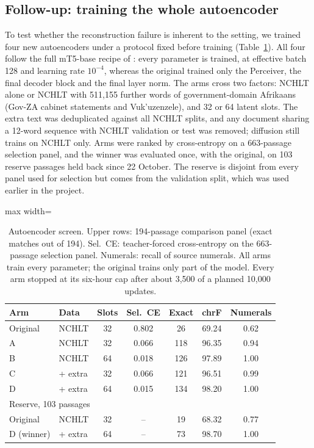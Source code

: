 \documentclass[11pt,a4paper]{article}
\begin{document}
\subsection{Follow-up: training the whole autoencoder}
\label{sec:res-aescreen}

To test whether the reconstruction failure is inherent to the setting, we trained four new autoencoders under a protocol fixed before training (Table~\ref{tab:aescreen}). All four follow the full mT5-base recipe of \citet{lovelace2023latent}: every parameter is trained, at effective batch 128 and learning rate $10^{-4}$, whereas the original trained only the Perceiver, the final decoder block and the final layer norm. The arms cross two factors: NCHLT alone or NCHLT with 511,155 further words of government-domain Afrikaans (Gov-ZA cabinet statements and Vuk'uzenzele), and 32 or 64 latent slots. The extra text was deduplicated against all NCHLT splits, and any document sharing a 12-word sequence with NCHLT validation or test was removed; diffusion still trains on NCHLT only. Arms were ranked by cross-entropy on a 663-passage selection panel, and the winner was evaluated once, with the original, on 103 reserve passages held back since 22 October. The reserve is disjoint from every panel used for selection but comes from the validation split, which was used earlier in the project.

\begin{table}[t]
\centering
\small
\begin{adjustbox}{max width=\columnwidth}
\begin{tabular}{llccccc}
\toprule
Arm & Data & Slots & Sel.\ CE & Exact & chrF & Numerals \\
\midrule
Original & NCHLT & 32 & 0.802 & 26 & 69.24 & 0.62 \\
A & NCHLT & 32 & 0.066 & 118 & 96.35 & 0.94 \\
B & NCHLT & 64 & 0.018 & 126 & 97.89 & 1.00 \\
C & + extra & 32 & 0.066 & 121 & 96.51 & 0.99 \\
D & + extra & 64 & 0.015 & 134 & 98.20 & 1.00 \\
\midrule
\multicolumn{7}{l}{Reserve, 103 passages} \\
Original & NCHLT & 32 & -- & 19 & 68.32 & 0.77 \\
D (winner) & + extra & 64 & -- & 73 & 98.70 & 1.00 \\
\bottomrule
\end{tabular}
\end{adjustbox}
\caption{Autoencoder screen. Upper rows: 194-passage comparison panel (exact matches out of 194). Sel.\ CE: teacher-forced cross-entropy on the 663-passage selection panel. Numerals: recall of source numerals. All arms train every parameter; the original trains only part of the model. Every arm stopped at its six-hour cap after about 3,500 of a planned 10,000 updates.}
\label{tab:aescreen}
\end{table}
\end{document}
